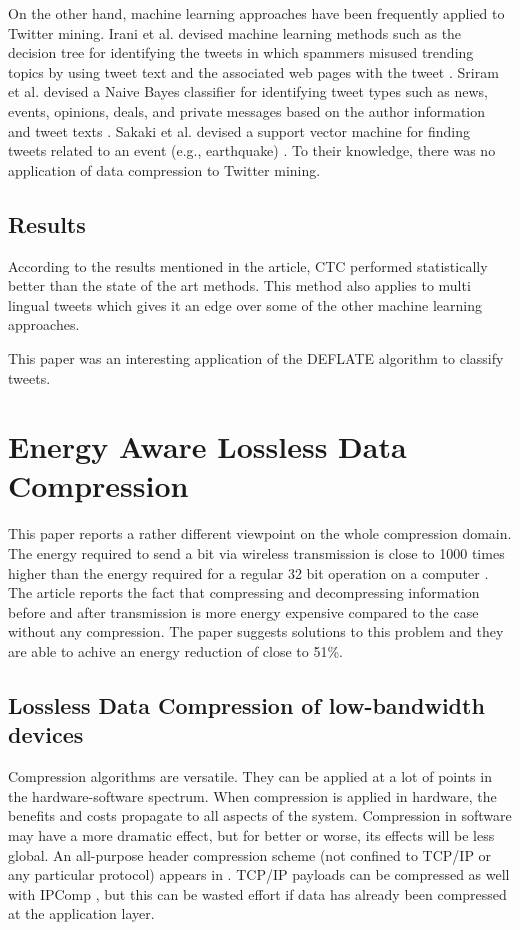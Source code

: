 \documentclass{article}
\begin{document}
On the other hand, machine learning approaches have been frequently applied to Twitter mining. Irani et al. devised machine learning methods such as the decision tree for identifying the tweets in which spammers misused
trending topics by using tweet text and the associated web
pages with the tweet \cite{irani2010study}. Sriram et al. devised a Naive Bayes
classifier for identifying tweet types such as news, events, opinions, deals, and private messages based on the author information and tweet texts \cite{sriram2010short}. Sakaki et al. devised a support vector machine for finding tweets related to an event (e.g., earthquake) \cite{sakaki2010earthquake}. To their knowledge, there was no application of data compression to Twitter mining.


\subsection{Results}

According to the results mentioned in the article, CTC performed statistically better than the state of the art methods. This method also applies to multi lingual tweets which gives it an edge over some of the other machine learning approaches.

This paper was an interesting application of the DEFLATE algorithm to classify tweets.


\section{Energy Aware Lossless Data Compression \cite{10.1145/1151690.1151692}}

This paper reports a rather different viewpoint on the whole compression domain. The energy required to send a bit via wireless transmission is close to 1000 times higher than the energy required for a regular 32 bit operation on a computer \cite{note1998writing}. The article reports the fact that compressing and decompressing information before and after transmission is more energy expensive compared to the case without any compression. The paper suggests solutions to this problem and they are able to achive an energy reduction of close to 51\%.

\subsection{Lossless Data Compression of low-bandwidth devices}
Compression algorithms are versatile. They can be applied at a lot of points in the hardware-software spectrum. When compression is applied in hardware, the benefits and costs propagate to all aspects of the system. Compression in software may
have a more dramatic effect, but for better or worse, its effects will be less global. An all-purpose header compression scheme (not confined to TCP/IP or any particular protocol) appears in \cite{lilley2000unified}. TCP/IP payloads can be compressed as well with IPComp \cite{shacham2001rfc3173}, but this can be wasted effort if data has already been compressed at the application layer.
\end{document}
